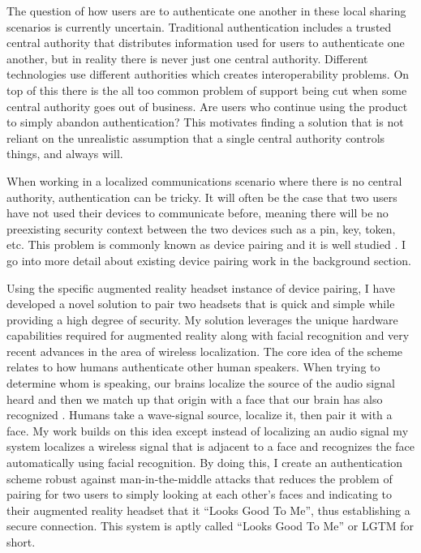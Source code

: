 \documentclass[12pt]{report}
\begin{document}
The question of how users are to authenticate one another in these local sharing scenarios is currently uncertain. Traditional authentication includes a trusted central authority that distributes information used for users to authenticate one another, but in reality there is never just one central authority. Different technologies use different authorities which creates interoperability problems. On top of this there is the all too common problem of support being cut when some central authority goes out of business. Are users who continue using the product to simply abandon authentication? This motivates finding a solution that is not reliant on the unrealistic assumption that a single central authority controls things, and always will. \par

When working in a localized communications scenario where there is no central authority, authentication can be tricky. It will often be the case that two users have not used their devices to communicate before, meaning there will be no preexisting security context between the two devices such as a pin, key, token, etc. This problem is commonly known as device pairing and it is well studied \cite{ConferenceCompStudySecurePairingKumar2009,VisualChannelPairingSaxena2006,InBandPairingGollaktoa2011,DucklingStajano2000,PlayfulPairingGallego2011,SASVaudenay2005,ManaGehrmann2004,ShakeWellBeforeUseMayrhofer2009,SeeingIsBelievingMcCune2005,TalkingToStrangersSmetters2002,LoudAndClearGoodrich2006,HapadepSoriente2008}. I go into more detail about existing device pairing work in the background section. \par 

Using the specific augmented reality headset instance of device pairing, I have developed a novel solution to pair two headsets that is quick and simple while providing a high degree of security. My solution leverages the unique hardware capabilities required for augmented reality along with facial recognition and very recent advances in the area of wireless localization. The core idea of the scheme relates to how humans authenticate other human speakers. When trying to determine whom is speaking, our brains localize the source of the audio signal heard and then we match up that origin with a face that our brain has also recognized \cite{SoundLocalizationHumanListenersMiddlebrooks1991,FaceVoicePersonPerceptionCampanella2016}. Humans take a wave-signal source, localize it, then pair it with a face. My work builds on this idea except instead of localizing an audio signal my system localizes a wireless signal that is adjacent to a face and recognizes the face automatically using facial recognition. By doing this, I create an authentication scheme robust against man-in-the-middle attacks that reduces the problem of pairing for two users to simply looking at each other's faces and indicating to their augmented reality headset that it ``Looks Good To Me'', thus establishing a secure connection. This system is aptly called ``Looks Good To Me'' or LGTM for short. \par
\end{document}
